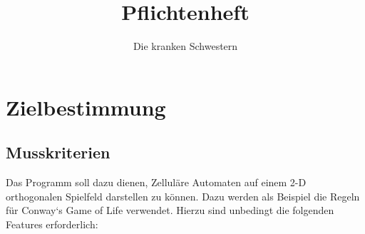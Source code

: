 \documentclass[11pt,a4paper]{article}
\begin{document}

\title{Pflichtenheft}

\author{Die kranken Schwestern}

\tableofcontents
\pagebreak

\section{Zielbestimmung}
\subsection{Musskriterien}
Das Programm soll dazu dienen, Zelluläre Automaten auf einem 2-D orthogonalen Spielfeld darstellen zu können. Dazu werden als Beispiel die Regeln für Conway`s Game of Life verwendet.
Hierzu sind unbedingt die folgenden Features erforderlich:

\par
\end{document}

